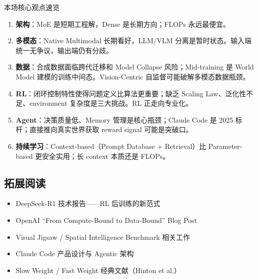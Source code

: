 \documentclass[a4paper]{article}
\begin{document}
\begin{importantbox}{本场核心观点速览}
\begin{enumerate}
  \item \textbf{架构}：MoE 是短期工程解，Dense 是长期方向；FLOPs 永远最便宜。
  \item \textbf{多模态}：Native Multimodal 长期看好，LLM/VLM 分离是暂时状态。输入端统一无争议，输出端仍有分歧。
  \item \textbf{数据}：合成数据面临跨代迁移和 Model Collapse 风险；Mid-training 是 World Model 建模的训练中间态。Vision-Centric 自监督可能破解多模态数据瓶颈。
  \item \textbf{RL}：闭环控制特性使得问题定义比算法更重要；缺乏 Scaling Law、泛化性不足、environment 复杂度是三大挑战。RL 正走向专业化。
  \item \textbf{Agent}：决策质量低、Memory 管理是核心瓶颈；Claude Code 是 2025 标杆；直接推向真实世界获取 reward signal 可能是突破口。
  \item \textbf{持续学习}：Context-based（Prompt Database + Retrieval）比 Parameter-based 更安全实用；长 context 本质还是 FLOPs。
\end{enumerate}
\end{importantbox}

\subsection{拓展阅读}
\begin{itemize}
  \item DeepSeek-R1 技术报告——RL 后训练的新范式
  \item OpenAI ``From Compute-Bound to Data-Bound'' Blog Post
  \item Visual Jigsaw / Spatial Intelligence Benchmark 相关工作
  \item Claude Code 产品设计与 Agentic 架构
  \item Slow Weight / Fast Weight 经典文献（Hinton et al.）
\end{itemize}
\end{document}
